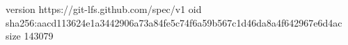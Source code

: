 version https://git-lfs.github.com/spec/v1
oid sha256:aacd113624e1a3442906a73a84fe5c74f6a59b567c1d46da8a4f642967e6d4ac
size 143079
